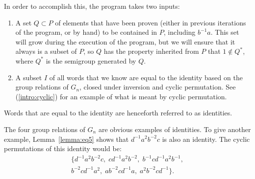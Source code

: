 In order to accomplish this, the program takes two inputs:
\begin{enumerate}
\item A set $Q\subset{}P$ of elements that have been proven (either in previous iterations of the program, or by hand) to be contained in $P$, including $b^{-1}a$. This set will grow during the execution of the program, but we will ensure that it always is a subset of $P$, so $Q$ has the property inherited from $P$ that $1\not\in Q^{*}$, where $Q^*$ is the semigroup generated by $Q$. 
\item A subset $I$ of all words that we know are equal to the identity based on the group relations of $G_n$, closed under inversion and cyclic permutation. See (\ref{intro:cyclic}) for an example of what is meant by cyclic permutation.
\end{enumerate}
\begin{remark}
Words that are equal to the identity are henceforth referred to as identities.
\end{remark}
The four group relations of $G_n$ are obvious examples of identities. To give another example, Lemma~\ref{lemma:eq5} shows that $d^{-1}a^{2}b^{-2}c$ is also an identity. The cyclic permutations of this identity would be:
\begin{align}
\{d^{-1}a^{2}b^{-2}c,\; cd^{-1}a^{2}b^{-2},\; b^{-1}cd^{-1}a^{2}b^{-1},\nonumber{}\\
b^{-2}cd^{-1}a^{2},\; ab^{-2}cd^{-1}a,\; a^{2}b^{-2}cd^{-1}\}. \label{intro:cyclic}
\end{align}






